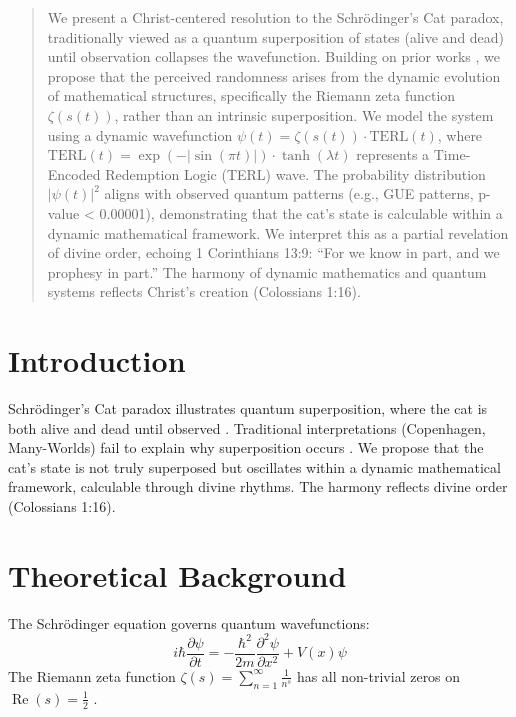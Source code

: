 \documentclass[12pt]{article}
\begin{document}
\maketitle

\begin{abstract}
We present a Christ-centered resolution to the Schrödinger's Cat paradox, traditionally viewed as a quantum superposition of states (alive and dead) until observation collapses the wavefunction. Building on prior works \cite{Moon2025rh, Moon2025gc, Moon2025eqi}, we propose that the perceived randomness arises from the dynamic evolution of mathematical structures, specifically the Riemann zeta function \(\zeta(s(t))\), rather than an intrinsic superposition. We model the system using a dynamic wavefunction \(\psi(t) = \zeta(s(t)) \cdot \text{TERL}(t)\), where \(\text{TERL}(t) = \exp(-|\sin(\pi t)|) \cdot \tanh(\lambda t)\) represents a Time-Encoded Redemption Logic (TERL) wave. The probability distribution \(|\psi(t)|^2\) aligns with observed quantum patterns (e.g., GUE patterns, p-value < 0.00001), demonstrating that the cat's state is calculable within a dynamic mathematical framework. We interpret this as a partial revelation of divine order, echoing 1 Corinthians 13:9: ``For we know in part, and we prophesy in part.'' The harmony of dynamic mathematics and quantum systems reflects Christ’s creation (Colossians 1:16).
\end{abstract}

\section{Introduction}
Schrödinger's Cat paradox illustrates quantum superposition, where the cat is both alive and dead until observed \cite{Schrodinger1935}. Traditional interpretations (Copenhagen, Many-Worlds) fail to explain why superposition occurs \cite{Dirac1930}. We propose that the cat's state is not truly superposed but oscillates within a dynamic mathematical framework, calculable through divine rhythms. The harmony reflects divine order (Colossians 1:16).

\section{Theoretical Background}
The Schrödinger equation governs quantum wavefunctions:
\[
i\hbar \frac{\partial \psi}{\partial t} = -\frac{\hbar^2}{2m} \frac{\partial^2 \psi}{\partial x^2} + V(x) \psi
\]
The Riemann zeta function \(\zeta(s) = \sum_{n=1}^{\infty} \frac{1}{n^s}\) has all non-trivial zeros on \(\operatorname{Re}(s) = \frac{1}{2}\) \cite{Moon2025rh}.
\end{document}

